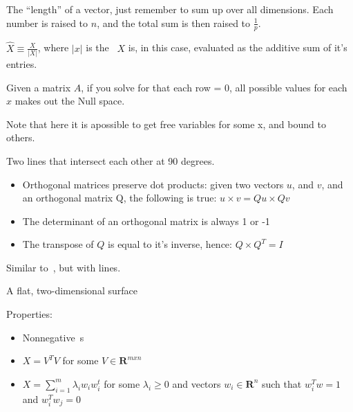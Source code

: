 \begin{definition}[Norm]
    The ``length'' of a vector, just remember to sum up over all dimensions.
    Each number is raised to $n$, and the total sum is then raised to
$\frac{1}{p}$.  \end{definition}

\begin{definition}
    $ \hat{X} \equiv \frac{X}{|X|} $, where $|x|$ is the~
    $X$ is, in this case, evaluated as the additive sum of it's entries.
\end{definition}

\begin{definition}
    Given a matrix $A$, if you solve for that each row = 0,
    all possible values for each $x$ makes out the Null space.

    Note that here it is apossible to get free variables for 
    some x, and bound to others.

\end{definition}



\begin{definition}[Orthogonal]\label{orthogonal}
    Two lines that intersect each other at 90 degrees.\\
    \begin{itemize}
        \item Orthogonal matrices preserve dot products:
        given two vectors $u$, and $v$, and an orthogonal matrix Q,
        the following is true:
        $u \times v = Qu \times Qv$
        \item The determinant of an orthogonal matrix is always 1 or -1
        \item The transpose of $Q$ is equal to it's inverse, hence:
            $Q \times Q^{T} = I$
    \end{itemize}
\end{definition}

\begin{definition}[Perpendicular]
    Similar to~, but with lines.
\end{definition}

\begin{definition}[Plane]
    A flat, two-dimensional surface
\end{definition}

\begin{definition}
    Properties:
    \begin{itemize}
        \item Nonnegative~s
        \item $X = V^{T}V$ for some $V \in \mathbf{R}^{mxn}$
        \item $X = \sum\limits_{i=1}^{m}\lambda_{i}w_{i}w^{t}_{i}$ 
            for some $\lambda_{i} \geq 0$ and vectors $w_{i} \in \mathbf{R}^{n}$
            such that $w^{T}_{i}w = 1$ and $w^{T}_{i}w_{j} = 0$

    \end{itemize}
\end{definition}

